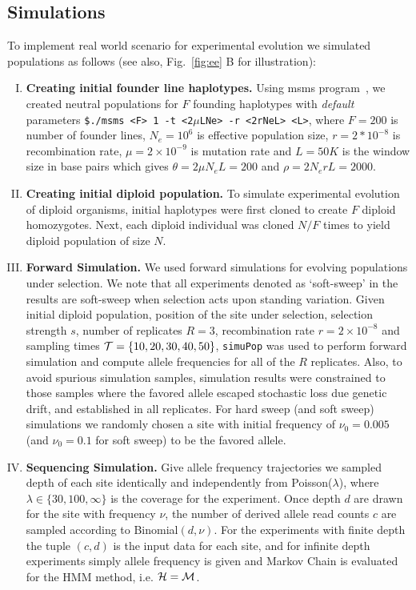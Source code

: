 \documentclass[11pt]{article}
\begin{document}
\subsection{Simulations}
To implement real world scenario for experimental evolution we
simulated populations as follows (see also, Fig.~\ref{fig:ee} B for
illustration):
\begin{enumerate}[I.]
\item {\bf Creating initial founder line haplotypes.} Using msms
  program~\cite{ewing2010msms}, we created neutral populations for $F$ founding
  haplotypes with \emph{default} parameters \texttt{\$./msms <F> 1 -t
    <2$\mu$LNe> -r <2rNeL> <L>}, where $F=200$ is number of founder
  lines, $N_e=10^6$ is effective population size, $r=2*10^{-8}$ is
  recombination rate, $\mu=2\times 10^{-9}$ is mutation rate and
  $L=50K$ is the window size in base pairs which gives $\theta=2\mu
  N_eL=200$ and $\rho=2N_erL=2000$. 
  
\item{\bf Creating initial diploid population.} To simulate
  experimental evolution of diploid organisms, initial haplotypes were
  first cloned to create $F$ diploid homozygotes. Next, each diploid
  individual was cloned $N/F$ times to yield diploid population of
  size $N$.

\item{\bf Forward Simulation.} We used forward simulations for
  evolving populations under selection. We note that all experiments
  denoted as `soft-sweep' in the results are soft-sweep when selection
  acts upon standing variation. Given initial diploid population,
  position of the site under selection, selection strength $s$, number
  of replicates $R=3$, recombination rate $r=2\times10^{-8}$ and
  sampling times ${\cal T}=\{10,20,30,40,50\}$, \texttt{simuPop} was used
  to perform forward simulation and compute allele frequencies for all
  of the $R$ replicates. Also, to avoid spurious simulation samples,
  simulation results were constrained to those samples where the
  favored allele escaped stochastic loss due genetic drift, and
  established in all replicates. For hard sweep (and soft sweep)
  simulations we randomly chosen a site with initial frequency of
  $\nu_0=0.005$ (and $\nu_0=0.1$ for soft sweep) to be the favored
  allele.
  \item{\bf Sequencing Simulation.} Give allele frequency trajectories we 
  sampled depth of each site  identically and independently from 
  Poisson($\lambda$), where $\lambda \in \{30,100,\infty\}$ is the coverage for 
  the experiment. Once depth $d$ are drawn for the site with frequency $\nu$, 
  the number of derived allele read counts $c$ are sampled according to 
  Binomial$(d,\nu)$. For the experiments with finite depth the tuple $(c,d)$ is 
  the input data for each site, and for infinite depth experiments simply 
  allele frequency is given and Markov Chain is evaluated for the HMM method, 
  i.e. ${\cal H}={\cal M}$.
\end{enumerate}
\end{document}

